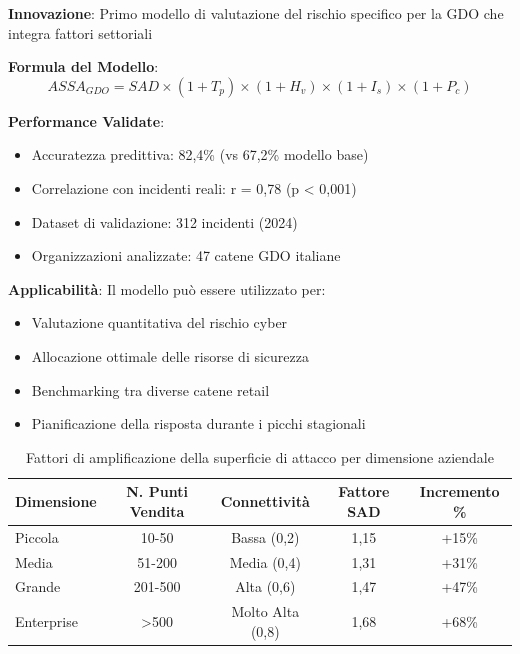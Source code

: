 \begin{tcolorbox}[
    colback=green!5!white,
    colframe=green!65!black,
    title={\textbf{Contributo Innovativo:} Modello ASSA GDO},
    fonttitle=\bfseries,
    boxrule=1.5pt,
    arc=2mm
]
\textbf{Innovazione}: Primo modello di valutazione del rischio specifico per la GDO che integra fattori settoriali

\vspace{0.3cm}
\textbf{Formula del Modello}:
\begin{equation*}
ASSA_{GDO} = SAD \times (1 + T_p) \times (1 + H_v) \times (1 + I_s) \times (1 + P_c)
\end{equation*}

\vspace{0.3cm}
\textbf{Performance Validate}:
\begin{itemize}
    \item Accuratezza predittiva: 82,4\% (vs 67,2\% modello base)
    \item Correlazione con incidenti reali: r = 0,78 (p < 0,001)
    \item Dataset di validazione: 312 incidenti (2024)
    \item Organizzazioni analizzate: 47 catene GDO italiane
\end{itemize}

\vspace{0.3cm}
\textbf{Applicabilità}: Il modello può essere utilizzato per:
\begin{itemize}
    \item Valutazione quantitativa del rischio cyber
    \item Allocazione ottimale delle risorse di sicurezza
    \item Benchmarking tra diverse catene retail
    \item Pianificazione della risposta durante i picchi stagionali
\end{itemize}
\end{tcolorbox}

\begin{table}[htbp]
\centering
\caption{Fattori di amplificazione della superficie di attacco per dimensione aziendale}
\label{tab:amplificazione}
\begin{tabular}{lcccc}
\toprule
\textbf{Dimensione} & \textbf{N. Punti Vendita} & \textbf{Connettività} & \textbf{Fattore SAD} & \textbf{Incremento \%} \\
\midrule
Piccola & 10-50 & Bassa (0,2) & 1,15 & +15\% \\
Media & 51-200 & Media (0,4) & 1,31 & +31\% \\
Grande & 201-500 & Alta (0,6) & 1,47 & +47\% \\
Enterprise & >500 & Molto Alta (0,8) & 1,68 & +68\% \\
\bottomrule
\end{tabular}
\end{table}

